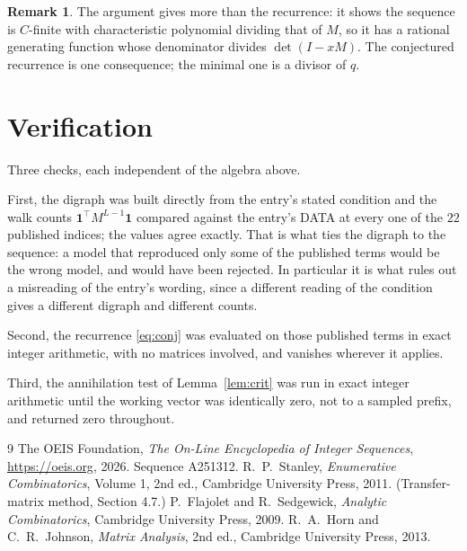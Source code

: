 \documentclass[11pt,a4paper]{article}
\theoremstyle{plain}
\theoremstyle{definition}
\newtheorem{remark}[theorem]{Remark}
\begin{document}
\begin{remark}
The argument gives more than the recurrence: it shows the sequence is $C$-finite with
characteristic polynomial dividing that of $M$, so it has a rational generating function
whose denominator divides $\det(I-xM)$. The conjectured recurrence is one consequence; the
minimal one is a divisor of $q$.
\end{remark}

\section{Verification}

Three checks, each independent of the algebra above.

First, the digraph was built directly from the entry's stated condition and the walk counts
$\mathbf{1}^{\!\top}M^{L-1}\mathbf{1}$ compared against the entry's DATA at
every one of the $22$ published indices; the values agree exactly. That is what ties
the digraph to the sequence: a model that reproduced only some of the published terms would
be the wrong model, and would have been rejected. In particular it is what rules out a
misreading of the entry's wording, since a different reading of the condition gives a
different digraph and different counts.

Second, the recurrence \eqref{eq:conj} was evaluated on those published terms in exact
integer arithmetic, with no matrices involved, and vanishes wherever it applies.

Third, the annihilation test of Lemma~\ref{lem:crit} was run in exact integer arithmetic
until the working vector was identically zero, not to a sampled prefix, and returned zero
throughout.

\begin{thebibliography}{9}
 The OEIS Foundation, \emph{The On-Line Encyclopedia of Integer
Sequences}, \url{https://oeis.org}, 2026. Sequence A251312.
 R.~P.~Stanley, \emph{Enumerative Combinatorics}, Volume 1, 2nd ed.,
Cambridge University Press, 2011. (Transfer-matrix method, Section 4.7.)
 P.~Flajolet and R.~Sedgewick, \emph{Analytic Combinatorics}, Cambridge
University Press, 2009.
 R.~A.~Horn and C.~R.~Johnson, \emph{Matrix Analysis}, 2nd ed., Cambridge
University Press, 2013.
\end{thebibliography}
\end{document}
